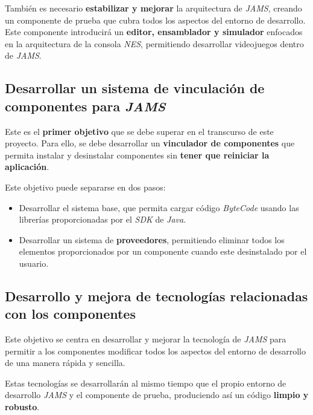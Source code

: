 También es necesario \textbf{estabilizar y mejorar}
la arquitectura de \textit{JAMS}, creando un componente
de prueba que cubra todos los aspectos del entorno de desarrollo.
Este componente introducirá un \textbf{editor, ensamblador y simulador}
enfocados en la arquitectura de la consola \textit{NES}, permitiendo
desarrollar videojuegos dentro de \textit{JAMS}.


\subsection{Desarrollar un sistema de vinculación de componentes para \textit{JAMS}}
\label{subsec:desarrollar-un-sistema-de-vinculacion-de-componentes-para-jams}

Este es el \textbf{primer objetivo} que se debe superar en el transcurso de este
proyecto.
Para ello, se debe desarrollar un \textbf{vinculador de componentes} que permita
instalar y desinstalar componentes sin \textbf{tener que reiniciar la aplicación}.

\noexpand Este objetivo puede separarse en dos pasos:
\begin{itemize}
    \item Desarrollar el sistema base, que permita cargar código \textit{ByteCode}
    usando las librerías proporcionadas por el \textit{SDK} de \textit{Java}.
    \item Desarrollar un sistema de \textbf{proveedores}, permitiendo
    eliminar todos los elementos proporcionados por un componente
    cuando este  desinstalado por el usuario.
\end{itemize}

\subsection{Desarrollo y mejora de tecnologías relacionadas con los componentes}
\label{subsec:desarrollo-y-mejora-de-tecnologias-relacionadas-con-los-componentes}

Este objetivo se centra en desarrollar y mejorar la tecnología de \textit{JAMS}
para permitir a los componentes modificar todos los aspectos del entorno de
desarrollo de una manera rápida y sencilla.

Estas tecnologías se desarrollarán al mismo tiempo que el propio entorno
de desarrollo \textit{JAMS} y el componente de prueba, produciendo así
un código \textbf{limpio y robusto}.

